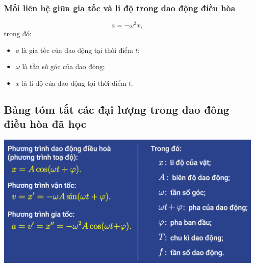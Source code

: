 \subsubsection{Mối liên hệ giữa gia tốc và li độ trong dao động điều hòa}
\begin{equation*}
	a=-\omega^2x,
\end{equation*}
trong đó:
\begin{itemize}
	\item $a$ là gia tốc của dao động tại thời điểm $t$;
	\item $\omega$ là tần số góc của dao động;
	\item $x$ là li độ của dao động tại thời điểm $t$.
\end{itemize}
\subsection{Bảng tóm tắt các đại lượng trong dao đông điều hòa đã học}
\begin{center}
	\includegraphics[scale=0.5]{../figs/VN12-PH-02-A-001-3-V2-1.png}
\end{center}
